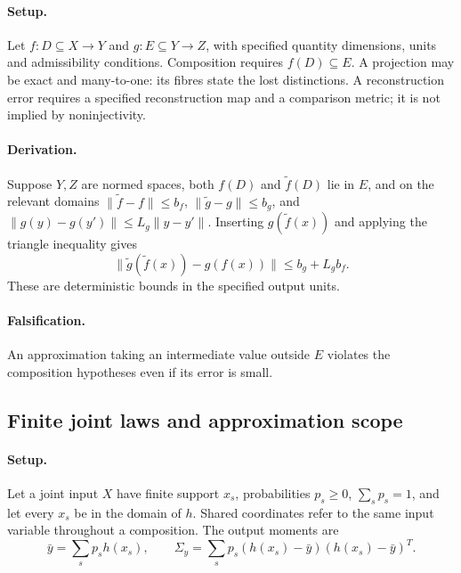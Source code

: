 \paragraph{Setup.}
Let \(f:D\subseteq X\to Y\) and \(g:E\subseteq Y\to Z\), with specified
quantity dimensions, units and admissibility conditions. Composition requires
\(f(D)\subseteq E\). A projection may be exact and many-to-one: its fibres
state the lost distinctions. A reconstruction error requires a specified
reconstruction map and a comparison metric; it is not implied by noninjectivity.

\paragraph{Derivation.}
\label{prop:m3-composed-bound}
Suppose \(Y,Z\) are normed spaces, both \(f(D)\) and \(\widetilde f(D)\)
lie in \(E\), and on the relevant domains
\(\|\widetilde f-f\|\le b_f\),
\(\|\widetilde g-g\|\le b_g\), and
\(\|g(y)-g(y')\|\le L_g\|y-y'\|\).
Inserting \(g(\widetilde f(x))\) and applying the triangle inequality gives
\begin{equation}
 \|\widetilde g(\widetilde f(x))-g(f(x))\|
 \le b_g+L_g b_f.
 \label{eq:m3-composed-bound}
\end{equation}
These are deterministic bounds in the specified output units.

\paragraph{Falsification.}
An approximation taking an intermediate value outside \(E\) violates the
composition hypotheses even if its error is small.

\subsection{Finite joint laws and approximation scope}
\label{prop:m3-finite-law}
\paragraph{Setup.}
Let a joint input \(X\) have finite support \(x_s\), probabilities
\(p_s\ge0\), \(\sum_s p_s=1\), and let every \(x_s\) be in the domain
of \(h\). Shared coordinates refer to the same input variable throughout
a composition. The output moments are
\begin{equation}
 \bar y=\sum_s p_sh(x_s),\qquad
 \Sigma_y=\sum_s p_s(h(x_s)-\bar y)(h(x_s)-\bar y)^T.
 \label{eq:m3-finite-law}
\end{equation}
